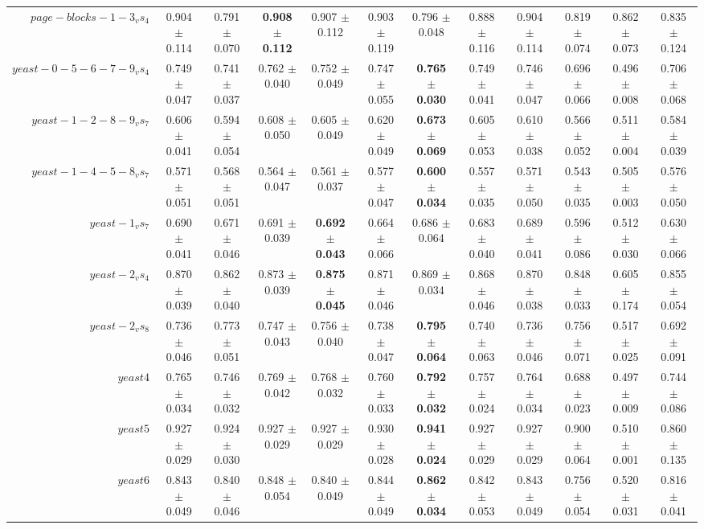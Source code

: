 \begin{table}[!ht]
{\begin{tabular}{r c c c c c c c c c c c}
$page-blocks-1-3_vs_4$ & 0.904 $\pm$ 0.114 & 0.791 $\pm$ 0.070 & \textbf{0.908 $\pm$ 0.112} & 0.907 $\pm$ 0.112 & 0.903 $\pm$ 0.119 & 0.796 $\pm$ 0.048 & 0.888 $\pm$ 0.116 & 0.904 $\pm$ 0.114 & 0.819 $\pm$ 0.074 & 0.862 $\pm$ 0.073 & 0.835 $\pm$ 0.124 \\
$yeast-0-5-6-7-9_vs_4$ & 0.749 $\pm$ 0.047 & 0.741 $\pm$ 0.037 & 0.762 $\pm$ 0.040 & 0.752 $\pm$ 0.049 & 0.747 $\pm$ 0.055 & \textbf{0.765 $\pm$ 0.030} & 0.749 $\pm$ 0.041 & 0.746 $\pm$ 0.047 & 0.696 $\pm$ 0.066 & 0.496 $\pm$ 0.008 & 0.706 $\pm$ 0.068 \\
$yeast-1-2-8-9_vs_7$ & 0.606 $\pm$ 0.041 & 0.594 $\pm$ 0.054 & 0.608 $\pm$ 0.050 & 0.605 $\pm$ 0.049 & 0.620 $\pm$ 0.049 & \textbf{0.673 $\pm$ 0.069} & 0.605 $\pm$ 0.053 & 0.610 $\pm$ 0.038 & 0.566 $\pm$ 0.052 & 0.511 $\pm$ 0.004 & 0.584 $\pm$ 0.039 \\
$yeast-1-4-5-8_vs_7$ & 0.571 $\pm$ 0.051 & 0.568 $\pm$ 0.051 & 0.564 $\pm$ 0.047 & 0.561 $\pm$ 0.037 & 0.577 $\pm$ 0.047 & \textbf{0.600 $\pm$ 0.034} & 0.557 $\pm$ 0.035 & 0.571 $\pm$ 0.050 & 0.543 $\pm$ 0.035 & 0.505 $\pm$ 0.003 & 0.576 $\pm$ 0.050 \\
$yeast-1_vs_7$ & 0.690 $\pm$ 0.041 & 0.671 $\pm$ 0.046 & 0.691 $\pm$ 0.039 & \textbf{0.692 $\pm$ 0.043} & 0.664 $\pm$ 0.066 & 0.686 $\pm$ 0.064 & 0.683 $\pm$ 0.040 & 0.689 $\pm$ 0.041 & 0.596 $\pm$ 0.086 & 0.512 $\pm$ 0.030 & 0.630 $\pm$ 0.066 \\
$yeast-2_vs_4$ & 0.870 $\pm$ 0.039 & 0.862 $\pm$ 0.040 & 0.873 $\pm$ 0.039 & \textbf{0.875 $\pm$ 0.045} & 0.871 $\pm$ 0.046 & 0.869 $\pm$ 0.034 & 0.868 $\pm$ 0.046 & 0.870 $\pm$ 0.038 & 0.848 $\pm$ 0.033 & 0.605 $\pm$ 0.174 & 0.855 $\pm$ 0.054 \\
$yeast-2_vs_8$ & 0.736 $\pm$ 0.046 & 0.773 $\pm$ 0.051 & 0.747 $\pm$ 0.043 & 0.756 $\pm$ 0.040 & 0.738 $\pm$ 0.047 & \textbf{0.795 $\pm$ 0.064} & 0.740 $\pm$ 0.063 & 0.736 $\pm$ 0.046 & 0.756 $\pm$ 0.071 & 0.517 $\pm$ 0.025 & 0.692 $\pm$ 0.091 \\
$yeast4$ & 0.765 $\pm$ 0.034 & 0.746 $\pm$ 0.032 & 0.769 $\pm$ 0.042 & 0.768 $\pm$ 0.032 & 0.760 $\pm$ 0.033 & \textbf{0.792 $\pm$ 0.032} & 0.757 $\pm$ 0.024 & 0.764 $\pm$ 0.034 & 0.688 $\pm$ 0.023 & 0.497 $\pm$ 0.009 & 0.744 $\pm$ 0.086 \\
$yeast5$ & 0.927 $\pm$ 0.029 & 0.924 $\pm$ 0.030 & 0.927 $\pm$ 0.029 & 0.927 $\pm$ 0.029 & 0.930 $\pm$ 0.028 & \textbf{0.941 $\pm$ 0.024} & 0.927 $\pm$ 0.029 & 0.927 $\pm$ 0.029 & 0.900 $\pm$ 0.064 & 0.510 $\pm$ 0.001 & 0.860 $\pm$ 0.135 \\
$yeast6$ & 0.843 $\pm$ 0.049 & 0.840 $\pm$ 0.046 & 0.848 $\pm$ 0.054 & 0.840 $\pm$ 0.049 & 0.844 $\pm$ 0.049 & \textbf{0.862 $\pm$ 0.034} & 0.842 $\pm$ 0.053 & 0.843 $\pm$ 0.049 & 0.756 $\pm$ 0.054 & 0.520 $\pm$ 0.031 & 0.816 $\pm$ 0.041 \\

\end{tabular}}
\end{table}

